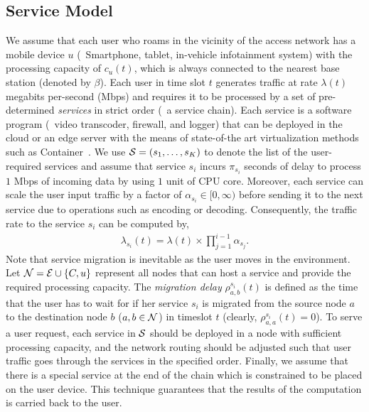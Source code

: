 \subsection{Service Model}
\label{sec:SFCrequest}
We assume that each user who roams in the vicinity of the access network has a mobile device $u$  (\eg\ Smartphone, tablet, in-vehicle infotainment system) with the processing capacity of $c_{u}(t)$, which is always connected to the nearest base station (denoted by $\beta$). Each user in time slot $t$ generates traffic at rate $\lambda(t)$ megabits per-second (Mbps) and requires it to be processed by a set of pre-determined \emph{services} in strict order (\aka\ a service chain). Each service is a software program (\eg\ video transcoder, firewall, and logger) that can be deployed in the cloud or an edge server with the means of state-of-the art virtualization methods such as Container~\cite{containerNFV}. We use $\mathcal{S}=(s_1, \dots, s_K)$ to denote the list of the user-required services and assume that service $s_i$ incurs $\pi_{s_{i}}$ seconds of delay to process $1$ Mbps of incoming data by using $1$ unit of CPU core. Moreover, each service can scale the user input traffic by a factor of $\alpha_{s_i}\in[0,\infty)$ before sending it to the next service due to operations such as encoding or decoding. Consequently, the traffic rate to the service $s_{i}$ can be computed by,
\begin{gather}
	\lambda_{s_{i}}(t) = \lambda(t) \times \prod_{j=1}^{i-1} \alpha_{s_j}.
\end{gather}
Note that service migration is inevitable as the user moves in the environment. Let $\mathcal{N}=\mathcal{E}\cup\{C, u\}$ represent all nodes that can host a service and provide the required processing capacity. The \textit{migration delay} $\rho_{a, b}^{s_{i}}(t)$
is defined as the time that the user has to wait for if her service $s_{i}$ is migrated from the source node $a$ to the destination node $b$ ($a,b \in \mathcal{N}$) in timeslot $t$ (clearly, $\rho_{a, a}^{s_{i}}(t)=0$). To serve a user request, each service in $\mathcal{S}$ should be deployed in a node with sufficient processing capacity, and the network routing should be adjusted such that user traffic goes through the services in the specified order. Finally, we assume that there is a special service at the end of the chain which is constrained to be placed on the user device. This technique guarantees that the results of the computation is carried back to the user.  

